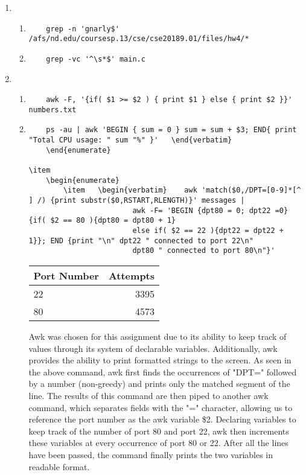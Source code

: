 \documentclass{article}
\begin{document}
\begin{enumerate}
\item
	\begin{enumerate}	
		\item	\begin{verbatim}	grep -n 'gnarly$' /afs/nd.edu/coursesp.13/cse/cse20189.01/files/hw4/*			\end{verbatim}
		\item	\begin{verbatim}	grep -vc '^\s*$' main.c									\end{verbatim}
	\end{enumerate}

\item
	\begin{enumerate}
		\item	\begin{verbatim}	awk -F, '{if( $1 >= $2 ) { print $1 } else { print $2 }}' numbers.txt				\end{verbatim}
		\item	\begin{verbatim}	ps -au | awk 'BEGIN { sum = 0 } sum = sum + $3; END{ print "Total CPU usage: " sum "%" }'	\end{verbatim}
	\end{enumerate}

\item
	\begin{enumerate}
		\item	\begin{verbatim}	awk 'match($0,/DPT=[0-9]*[^ ] /) {print substr($0,RSTART,RLENGTH)}' messages | 
						awk -F= 'BEGIN {dpt80 = 0; dpt22 =0} {if( $2 == 80 ){dpt80 = dpt80 + 1} 
						else if( $2 == 22 ){dpt22 = dpt22 + 1}}; END {print "\n" dpt22 " connected to port 22\n" 
						dpt80 " connected to port 80\n"}'								\end{verbatim}
	\begin{table}[!htb]
		\centering
		\begin{tabular}{ l | r  }
		\hline
		Port Number & Attempts \\ \hline
		22 & 3395 \\ 
		80 & 4573 \\
		\hline
		\end{tabular}
	\end{table}

	Awk was chosen for this assignment due to its ability to keep track of values through its system of declarable variables. Additionally, awk provides the ability to print formatted strings to the screen. As seen in the above command, awk first finds the occurrences of "DPT=" followed by a number (non-greedy) and prints only the matched segment of the line. The results of this command are then piped to another awk command, which separates fields with the "=" character, allowing us to reference the port number as the awk variable \$2. Declaring variables to keep track of the number of port 80 and port 22, awk then increments these variables at every occurrence of port 80 or 22. After all the lines have been passed, the command finally prints the two variables in readable format.


\end{enumerate}
\end{enumerate}
\end{document}
